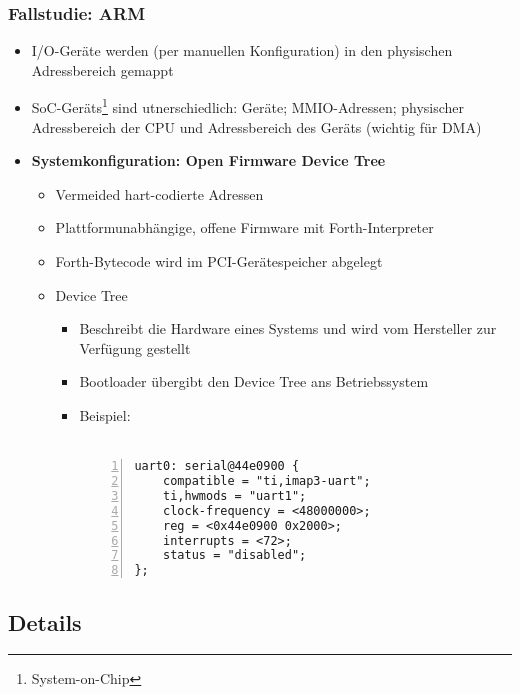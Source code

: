 \subsubsection{Fallstudie: ARM}
\begin{itemize}
	\item I/O-Geräte werden (per manuellen Konfiguration) in den physischen Adressbereich gemappt
	\item SoC-Geräts\footnote{System-on-Chip} sind utnerschiedlich: Geräte; MMIO-Adressen; physischer Adressbereich der CPU und Adressbereich des Geräts (wichtig für DMA)
	\item \textbf{Systemkonfiguration: Open Firmware Device Tree}
	\begin{itemize}
		\item Vermeided hart-codierte Adressen
		\item Plattformunabhängige, offene Firmware mit Forth-Interpreter
		\item Forth-Bytecode wird im PCI-Gerätespeicher abgelegt
		\item Device Tree
		\begin{itemize}
			\item Beschreibt die Hardware eines Systems und wird vom Hersteller zur Verfügung gestellt
			\item Bootloader übergibt den Device Tree ans Betriebssystem
			\item Beispiel:\\\\
\begin{minipage}{\linewidth}
\begin{lstlisting}[frame=single,numbers=left,mathescape,tabsize=4]
uart0: serial@44e0900 {
	compatible = "ti,imap3-uart";
	ti,hwmods = "uart1";
	clock-frequency = <48000000>;
	reg = <0x44e0900 0x2000>;
	interrupts = <72>;
	status = "disabled";
};
\end{lstlisting}
\end{minipage}
		\end{itemize}
	\end{itemize}
\end{itemize}


\subsection{Details}

